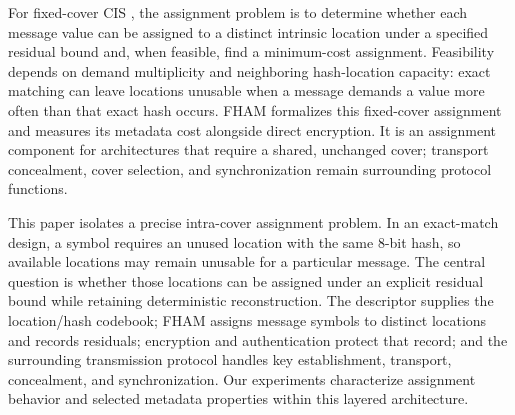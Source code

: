 \documentclass[preprint,12pt]{elsarticle}
\theoremstyle{plain}
\providecommand{\DIFaddtex}[1]{{\protect\color{blue} \sf #1}} %
\providecommand{\DIFdeltex}[1]{{\protect\color{red} \scriptsize #1}} %
\providecommand{\DIFaddbegin}{} %
\providecommand{\DIFaddend}{} %
\providecommand{\DIFdelbegin}{} %
\providecommand{\DIFdelend}{} %
\providecommand{\DIFadd}[1]{\texorpdfstring{\DIFaddtex{#1}}{#1}} %
\providecommand{\DIFdel}[1]{\texorpdfstring{\DIFdeltex{#1}}{}} %
\providecommand{\DIFscaledelfig}{0.5}
\newlength{\DIFdelgraphicswidth} %
\newlength{\DIFdelgraphicsheight} %
\providecommand{\DIFaddincludegraphics}[2][]{{\color{blue}\fbox{\DIFOincludegraphics[#1]{#2}}}} %
\providecommand{\DIFdelincludegraphics}[2][]{%
\sbox{\DIFdelgraphicsbox}{\DIFOincludegraphics[#1]{#2}}%
\settoboxwidth{\DIFdelgraphicswidth}{\DIFdelgraphicsbox} %
\settoboxtotalheight{\DIFdelgraphicsheight}{\DIFdelgraphicsbox} %
\scalebox{\DIFscaledelfig}{%
\parbox[b]{\DIFdelgraphicswidth}{\usebox{\DIFdelgraphicsbox}\\[-\baselineskip] \rule{\DIFdelgraphicswidth}{0em}}\llap{\resizebox{\DIFdelgraphicswidth}{\DIFdelgraphicsheight}{%
\setlength{\unitlength}{\DIFdelgraphicswidth}%
\begin{picture}(1,1)%
\thicklines\linethickness{2pt} %
{\color[rgb]{1,0,0}\put(0,0){\framebox(1,1){}}}%
{\color[rgb]{1,0,0}\put(0,0){\line( 1,1){1}}}%
{\color[rgb]{1,0,0}\put(0,1){\line(1,-1){1}}}%
\end{picture}%
}\hspace*{3pt}}} %
} %
\DeclareRobustCommand{\DIFaddbegin}{\DIFOaddbegin \let\includegraphics\DIFaddincludegraphics} %
\DeclareRobustCommand{\DIFaddend}{\DIFOaddend \let\includegraphics\DIFOincludegraphics} %
\DeclareRobustCommand{\DIFdelbegin}{\DIFOdelbegin \let\includegraphics\DIFdelincludegraphics} %
\DeclareRobustCommand{\DIFdelend}{\DIFOaddend \let\includegraphics\DIFOincludegraphics} %
\renewcommand{\DIFdel}[1]{}
\renewcommand{\DIFdelincludegraphics}[2][]{}
\begin{document}
For \DIFdelbegin \DIFdel{secure multimedia communication, }\DIFdelend fixed-cover CIS\DIFdelbegin \DIFdel{creates a distinct assignment problem : given a cover and a message, }\DIFdelend \DIFaddbegin \DIFadd{, the assignment problem is to }\DIFaddend determine whether each message value can be assigned to a distinct intrinsic location under a specified residual bound \DIFdelbegin \DIFdel{, and}\DIFdelend \DIFaddbegin \DIFadd{and, when feasible, }\DIFaddend find a minimum-cost assignment\DIFdelbegin \DIFdel{when one exists}\DIFdelend . Feasibility depends on demand multiplicity and neighboring hash-location capacity: exact matching can leave locations \DIFdelbegin \DIFdel{unused }\DIFdelend \DIFaddbegin \DIFadd{unusable }\DIFaddend when a message demands a value more often than that exact hash occurs. FHAM formalizes this fixed-cover assignment and measures its metadata cost alongside direct encryption. \DIFdelbegin \DIFdel{Its value is a formally characterized }\DIFdelend \DIFaddbegin \DIFadd{It is an }\DIFaddend assignment component for architectures that require a shared, unchanged cover\DIFdelbegin \DIFdel{and location-level representation}\DIFdelend ; transport concealment, cover selection, and synchronization remain surrounding protocol functions.

This paper isolates a precise intra-cover assignment problem. In an exact-match design, a symbol requires an unused location with the same 8-bit hash, so available locations may remain unusable for a particular message. The central question is whether those locations can be assigned under an explicit residual bound while retaining deterministic reconstruction. The descriptor supplies the location/hash codebook; FHAM assigns message symbols to distinct locations and records residuals; encryption and authentication protect that record; and the surrounding transmission protocol handles key establishment, transport, concealment, and synchronization. Our experiments characterize assignment behavior and selected metadata properties within this layered architecture.
\end{document}
